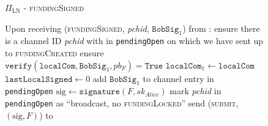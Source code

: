  \begin{figure}[H]
    \begin{protocolbox}{$\Pi_{\mathrm{LN}}$ - \textsc{fundingSigned}}
      \begin{algorithmic}[1]
        \State Upon receiving (\textsc{fundingSigned}, \textit{pchid},
        $\mathtt{BobSig}_1$) from \bob:
        \Indent
          \State ensure there is a channel ID \textit{pchid} with \bob{} in
          \texttt{pendingOpen} on which we have sent up to
          \textsc{fundingCreated}
          \State ensure $\mathtt{verify}\left(\mathtt{localCom},
          \mathtt{BobSig}_1, pb_F\right) = \mathtt{True}$
          \State $\mathtt{localCom}_1 \gets \mathtt{localCom}$
          \State $\mathtt{lastLocalSigned} \gets 0$
          \State add $\mathtt{BobSig}_1$ to channel entry in
          \texttt{pendingOpen}
          \State $\mathrm{sig} \gets \mathtt{signature}\left(F,
          sk_{\mathit{Alice}}\right)$
          \State mark \textit{pchid} in \texttt{pendingOpen} as ``broadcast, no
          \textsc{fundingLocked}''
          \label{alg:protocol:open:fundingSigned:mark}
          \State send (\textsc{submit}, $\left(\mathrm{sig}, F\right)$) to
          \ledger
        \EndIndent
      \end{algorithmic}
    \end{protocolbox}
    \caption{}
    \label{alg:protocol:open:fundingSigned}
  \end{figure}


